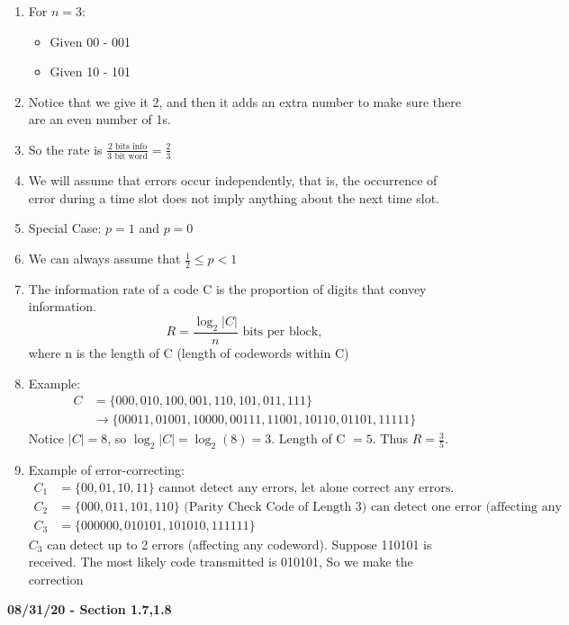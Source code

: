 \documentclass[11pt]{article}
\begin{document}
	\begin{enumerate}
		\item For $n=3$:
			\begin{itemize}
				\item Given 00 - 001
				\item Given 10 - 101
			\end{itemize}
		\item Notice that we give it 2, and then it adds an extra number to make sure there are an even number of 1s.
		\item So the rate is $\frac{2 \text{ bits info}}{3 \text{ bit word}} = \frac{2}{3}$
		\item We will assume that errors occur independently, that is, the occurrence of error during a time slot does not imply anything about the next time slot.
		\item Special Case: $p = 1$ and $p = 0$
		\item We can always assume that $\frac{1}{2} \leq p < 1$
		\item The information rate of a code C is the proportion of digits that convey information.
		$$R = \frac{\log_2|C|}{n} \text{ bits per block},$$
		where n is the length of C (length of codewords within C)
		\item Example:
			\begin{align*}
				C &= \{000,010,100,001,110,101,011,111\} \\
				&\rightarrow \{00011,01001,10000,00111,11001,10110,01101,11111\}
			\end{align*}
		Notice $|C| = 8$, so $\log_2|C| = \log_2 (8) = 3$.  Length of C $ = 5$.  Thus $R = \frac{3}{5}$.
		\item Example of error-correcting:
		\begin{align*}
			C_1 &= \{00,01,10,11\} \text{ cannot detect any errors, let alone correct any errors.} \\
			C_2 &= \{000,011,101,110\} \text{ (Parity Check Code of Length 3) can detect one error (affecting any codeword).} \\
			C_3 &= \{000000, 010101, 101010, 111111\}
		\end{align*}
		$C_3$ can detect up to 2 errors (affecting any codeword).  Suppose 110101 is received. The most likely code transmitted is 010101, So we make the correction
	\end{enumerate}
	\newpage
	\textbf{08/31/20 - Section 1.7,1.8}
\end{document}
